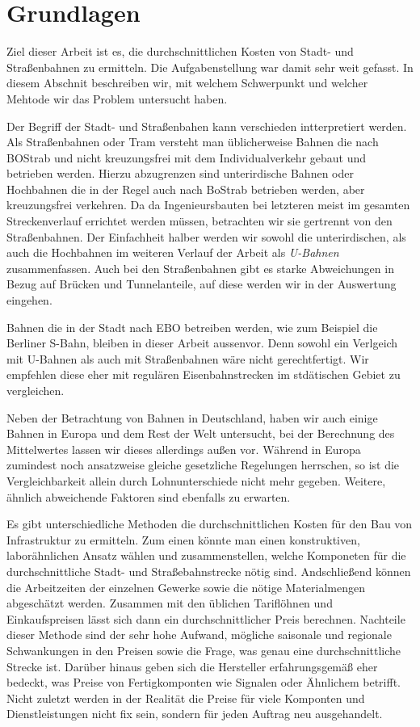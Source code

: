 \chapter{Grundlagen}

Ziel dieser Arbeit ist es, die durchschnittlichen Kosten von Stadt- und
Straßenbahnen zu ermitteln. Die Aufgabenstellung war damit sehr weit gefasst. In
diesem Abschnit beschreiben wir, mit welchem Schwerpunkt und welcher Mehtode wir
das Problem untersucht haben.

Der Begriff der Stadt- und Straßenbahen kann verschieden intterpretiert
werden. Als Straßenbahnen oder Tram versteht man üblicherweise Bahnen die nach
BOStrab \cite{bostrab} und nicht kreuzungsfrei mit dem Individualverkehr gebaut
und betrieben werden. Hierzu abzugrenzen sind unterirdische Bahnen oder
Hochbahnen die in der Regel auch nach BoStrab betrieben werden, aber
kreuzungsfrei verkehren. Da da Ingenieursbauten bei letzteren meist im gesamten
Streckenverlauf errichtet werden müssen, betrachten wir sie gertrennt von den
Straßenbahnen. Der Einfachheit halber werden wir sowohl die unterirdischen, als
auch die Hochbahnen im weiteren Verlauf der Arbeit als \emph{U-Bahnen}
zusammenfassen. Auch bei den Straßenbahnen gibt es starke Abweichungen in Bezug
auf Brücken und Tunnelanteile, auf diese werden wir in der Auswertung eingehen.

Bahnen die in der Stadt nach EBO \cite{ebo} betreiben werden, wie zum Beispiel
die Berliner S-Bahn, bleiben in dieser Arbeit aussenvor. Denn sowohl ein
Verlgeich mit U-Bahnen als auch mit Straßenbahnen wäre nicht gerechtfertigt. Wir
empfehlen diese eher mit regulären Eisenbahnstrecken im stdätischen Gebiet zu
vergleichen.

Neben der Betrachtung von Bahnen in Deutschland, haben wir auch einige Bahnen in
Europa und dem Rest der Welt untersucht, bei der Berechnung des Mittelwertes
lassen wir dieses allerdings außen vor. Während in Europa zumindest noch
ansatzweise gleiche gesetzliche Regelungen herrschen, so ist die
Vergleichbarkeit allein durch Lohnunterschiede nicht mehr gegeben. Weitere,
ähnlich abweichende Faktoren sind ebenfalls zu erwarten.

Es gibt unterschiedliche Methoden die durchschnittlichen Kosten für den Bau von
Infrastruktur zu ermitteln. Zum einen könnte man einen konstruktiven,
laborähnlichen Ansatz wählen und zusammenstellen, welche Komponeten für die
durchschnittliche Stadt- und Straßebahnstrecke nötig sind. Andschließend können
die Arbeitzeiten der einzelnen Gewerke sowie die nötige Materialmengen
abgeschätzt werden. Zusammen mit den üblichen Tariflöhnen und Einkaufspreisen
lässt sich dann ein durchschnittlicher Preis berechnen. Nachteile dieser Methode
sind der sehr hohe Aufwand, mögliche saisonale und regionale Schwankungen in den
Preisen sowie die Frage, was genau eine durchschnittliche Strecke ist. Darüber
hinaus geben sich die Hersteller erfahrungsgemäß eher bedeckt, was Preise von
Fertigkomponten wie Signalen oder Ähnlichem betrifft. Nicht zuletzt werden in
der Realität die Preise für viele Komponten und Dienstleistungen nicht fix sein,
sondern für jeden Auftrag neu ausgehandelt.

